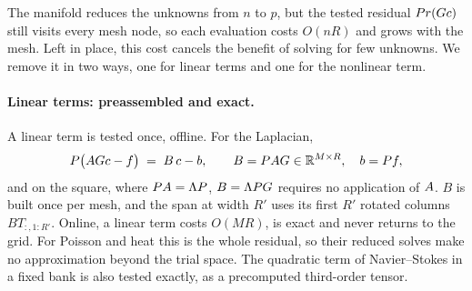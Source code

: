\documentclass{article}
\begin{document}
The manifold reduces the unknowns from $n$ to $p$, but the tested
residual $Pr(G c)$ still visits every mesh node, so each
evaluation costs $O(nR)$ and grows with the mesh. Left in place, this
cost cancels the benefit of solving for few unknowns. We remove it in two
ways, one for linear terms and one for the nonlinear term.

\paragraph{Linear terms: preassembled and exact.}
A linear term is tested once, offline. For the Laplacian,
\begin{equation}
  P\big(AG c-f\big) \;=\; B\,c-b,
  \qquad
  B=PAG\in\mathbb{R}^{M\times R},\quad b=P f,
  \label{eq:preassembled}
\end{equation}
and on the square, where $PA=\Lambda P$, $B=\Lambda PG$
requires no application of $A$. $B$ is built once per mesh, and the
span at width $R'$ uses its first $R'$ rotated columns $BT_{:,1:R'}$.
Online, a linear term costs $O(MR)$, is exact and never returns to the
grid. For Poisson and heat this is the whole residual, so their reduced
solves make no approximation beyond the trial space. The quadratic term
of Navier--Stokes in a fixed bank is also tested exactly, as a
precomputed third-order tensor.
\end{document}
